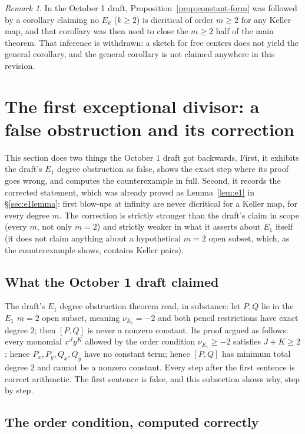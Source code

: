 \documentclass[a4paper,11pt]{article}
\theoremstyle{plain}
\theoremstyle{definition}
\theoremstyle{remark}
\newtheorem{remark}[theorem]{Remark}
\begin{document}
\begin{remark}
In the October 1 draft, Proposition~\ref{prop:constant-form} was followed by a corollary
claiming no $E_k$ ($k \geq 2$) is dicritical of order $m \geq 2$ for any Keller map, and that
corollary was then used to close the $m \geq 2$ half of the main theorem. That inference is
withdrawn: a sketch for free centers does not yield the general corollary, and the general
corollary is not claimed anywhere in this revision.
\end{remark}

\section{The first exceptional divisor: a false obstruction and its correction}\label{sec:e1}

This section does two things the October 1 draft got backwards. First, it exhibits the draft's
$E_1$ degree obstruction as false, shows the exact step where its proof goes wrong, and
computes the counterexample in full. Second, it records the corrected statement, which was
already proved as Lemma~\ref{lem:e1} in \S\ref{sec:e1lemma}: first blow-ups at infinity are
never dicritical for a Keller map, for every degree $m$. The correction is strictly stronger
than the draft's claim in scope (every $m$, not only $m = 2$) and strictly weaker in what it
asserts about $E_1$ itself (it does not claim anything about a hypothetical $m = 2$ open
subset, which, as the counterexample shows, contains Keller pairs).

\subsection{What the October 1 draft claimed}

The draft's $E_1$ degree obstruction theorem read, in substance: let
$P, Q$ lie in the $E_1$ $m = 2$ open subset, meaning $\nu_{E_1} = -2$ and both pencil
restrictions have exact degree $2$; then $[P,Q]$ is never a nonzero constant. Its proof argued
as follows: every monomial $x^J y^K$ allowed by the order condition $\nu_{E_1} \geq -2$
satisfies $J + K \geq 2$; hence $P_x, P_y, Q_x, Q_y$ have no constant term; hence $[P,Q]$ has
minimum total degree $2$ and cannot be a nonzero constant. Every step after the first
sentence is correct arithmetic. The first sentence is false, and this subsection shows why,
step by step.

\subsection{The order condition, computed correctly}
\end{document}
